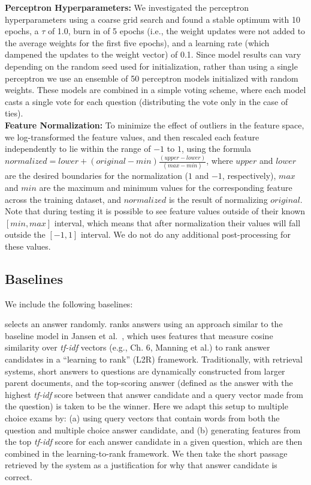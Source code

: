 {\flushleft \textbf{Perceptron Hyperparameters:}} We investigated the perceptron hyperparameters using a coarse grid search and found a stable optimum with 10 epochs, a $\tau$ of 1.0, burn in of 5 epochs (i.e., the weight updates were not added to the average weights for the first five epochs), and a learning rate (which dampened the updates to the weight vector) of 0.1. Since model results can vary depending on the random seed used for initialization, rather than using a single perceptron we use an ensemble of 50 perceptron models initialized with random weights.  These models are combined in a simple voting scheme, where each model casts a single vote for each question (distributing the vote only in the case of ties).\\

{\flushleft \textbf{Feature Normalization:}} To minimize the effect of outliers in the feature space, we log-transformed the feature values, and then rescaled each feature independently to lie within the range of $-1$ to $1$, using the formula
\mbox{$normalized  = lower + (original - min)\frac{(upper - lower)}{(max - min)}$},
where $upper$ and $lower$ are the desired boundaries for the normalization ($1$ and $-1$, respectively), $max$ and $min$ are the maximum and minimum values for the corresponding feature across the training dataset, and $normalized$ is the result of normalizing $original$.
Note that during testing it is possible to see feature values outside of their known $[min, max]$ interval, which means that after normalization their values will fall outside the $[-1, 1]$ interval. We do not do any additional post-processing for these values.


\subsection{Baselines}
\label{sec-cl2017:baselines}

We include the following baselines: 

{} selects an answer randomly.
{} ranks answers using an approach similar to the baseline model in Jansen et al.~\citeyear{jansen14}, which uses features that measure cosine similarity over {\em tf-idf} vectors (e.g., Ch. 6, Manning et al.\citeyear{manning08}) to rank answer candidates in a ``learning to rank'' (L2R) framework.  
Traditionally, with retrieval systems, short answers to questions are dynamically constructed from larger parent documents, and the top-scoring answer (defined as the answer with the highest {\em tf-idf} score between that answer candidate and a query vector made from the question) is taken to be the winner.  Here we adapt this setup to multiple choice exams by: (a) using query vectors that contain words from both the question and multiple choice answer candidate, and (b) generating features from the top {\em tf-idf} score for each answer candidate in a given question, which are then combined in the learning-to-rank framework.  We then take the short passage retrieved by the system as a justification for why that answer candidate is correct. 

